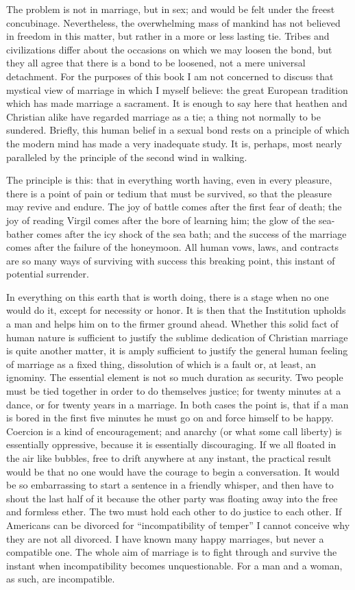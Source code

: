 \documentclass{book}
\begin{document}
The problem is not in marriage, but in sex; and would be felt under the freest concubinage. Nevertheless, the overwhelming mass of mankind has not believed in freedom in this matter, but rather in a more or less lasting tie. Tribes and civilizations differ about the occasions on which we may loosen the bond, but they all agree that there is a bond to be loosened, not a mere universal detachment. For the purposes of this book I am not concerned to discuss that mystical view of marriage in which I myself believe: the great European tradition which has made marriage a sacrament. It is enough to say here that heathen and Christian alike have regarded marriage as a tie; a thing not normally to be sundered. Briefly, this human belief in a sexual bond rests on a principle of which the modern mind has made a very inadequate study. It is, perhaps, most nearly paralleled by the principle of the second wind in walking.

The principle is this: that in everything worth having, even in every pleasure, there is a point of pain or tedium that must be survived, so that the pleasure may revive and endure. The joy of battle comes after the first fear of death; the joy of reading Virgil comes after the bore of learning him; the glow of the sea-bather comes after the icy shock of the sea bath; and the success of the marriage comes after the failure of the honeymoon. All human vows, laws, and contracts are so many ways of surviving with success this breaking point, this instant of potential surrender.

In everything on this earth that is worth doing, there is a stage when no one would do it, except for necessity or honor. It is then that the Institution upholds a man and helps him on to the firmer ground ahead. Whether this solid fact of human nature is sufficient to justify the sublime dedication of Christian marriage is quite another matter, it is amply sufficient to justify the general human feeling of marriage as a fixed thing, dissolution of which is a fault or, at least, an ignominy. The essential element is not so much duration as security. Two people must be tied together in order to do themselves justice; for twenty minutes at a dance, or for twenty years in a marriage. In both cases the point is, that if a man is bored in the first five minutes he must go on and force himself to be happy. Coercion is a kind of encouragement; and anarchy (or what some call liberty) is essentially oppressive, because it is essentially discouraging. If we all floated in the air like bubbles, free to drift anywhere at any instant, the practical result would be that no one would have the courage to begin a conversation. It would be so embarrassing to start a sentence in a friendly whisper, and then have to shout the last half of it because the other party was floating away into the free and formless ether. The two must hold each other to do justice to each other. If Americans can be divorced for “incompatibility of temper” I cannot conceive why they are not all divorced. I have known many happy marriages, but never a compatible one. The whole aim of marriage is to fight through and survive the instant when incompatibility becomes unquestionable. For a man and a woman, as such, are incompatible.
\end{document}
